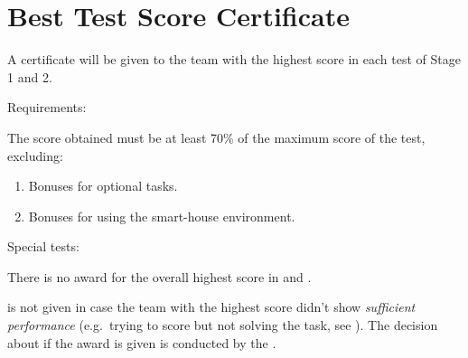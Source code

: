 \section{Best Test Score Certificate}\label{sec:best_score_certificate}
A certificate will be given to the team with the highest score in each test of Stage 1 and 2. 

\begin{enumerate}
	{\bf\item Requirements:} The score obtained must be at least 70\% of the maximum score of the test, excluding:
	\begin{enumerate}
		\item Bonuses for optional tasks.
		\item Bonuses for using the smart-house environment.
	\end{enumerate}
	{\bf\item Special tests:} There is no award for the overall highest score in  and .
\end{enumerate}

 is not given in case the team with the highest score didn't show \emph{sufficient performance} (e.g.~trying to score but not solving the task, see ). The decision about if the award is given is conducted by the .



